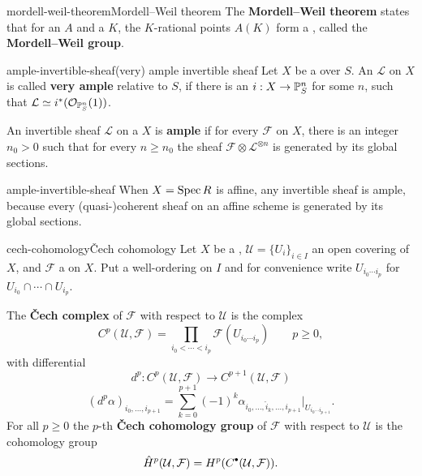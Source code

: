 \begin{topic}{mordell-weil-theorem}{Mordell--Weil theorem}
    The \textbf{Mordell--Weil theorem} states that for an  $A$ and a  $K$, the $K$-rational points $A(K)$ form a   , called the \textbf{Mordell--Weil group}.
\end{topic}

\begin{topic}{ample-invertible-sheaf}{(very) ample invertible sheaf}
    Let $X$ be a  over $S$. An  $\mathcal{L}$ on $X$ is called \textbf{very ample} relative to $S$, if there is an  $i : X \to \mathbb{P}_S^n$ for some $n$, such that $\mathcal{L} \simeq i^*(\mathcal{O}_{\mathbb{P}_S^n}(1))$.
    
    An invertible sheaf $\mathcal{L}$ on a  $X$ is \textbf{ample} if for every  $\mathcal{F}$ on $X$, there is an integer $n_0 > 0$ such that for every $n \ge n_0$ the sheaf $\mathcal{F} \otimes \mathcal{L}^{\otimes n}$ is generated by its global sections.
\end{topic}

\begin{example}{ample-invertible-sheaf}
    When $X = \operatorname{Spec} R$ is affine, any invertible sheaf is ample, because every (quasi-)coherent sheaf on an affine scheme is generated by its global sections.
\end{example}

\begin{topic}{cech-cohomology}{Čech cohomology}
    Let $X$ be a , $\mathcal{U} = \{ U_i \}_{i \in I}$ an open covering of $X$, and $\mathcal{F}$ a  on $X$. Put a well-ordering on $I$ and for convenience write $U_{i_0 \cdots i_p}$ for $U_{i_0} \cap \cdots \cap U_{i_p}$.
    
    The \textbf{Čech complex} of $\mathcal{F}$ with respect to $\mathcal{U}$ is the complex
    \[ C^p(\mathcal{U}, \mathcal{F}) = \prod_{i_0 < \cdots < i_p} \mathcal{F}(U_{i_0 \cdots i_p}) \qquad p \ge 0 , \]
    with differential
    \[ d^p : C^p(\mathcal{U}, \mathcal{F}) \to C^{p + 1}(\mathcal{U}, \mathcal{F}) \]
    \[ (d^p \alpha)_{i_0 , \ldots , i_{p + 1}} = \sum_{k = 0}^{p + 1} (-1)^k \alpha_{i_0 , \ldots , \hat{i}_k, \ldots, i_{p + 1}} | _{U_{i_0 \cdots i_{p + 1}}} . \]
    For all $p \ge 0$ the $p$-th \textbf{Čech cohomology group} of $\mathcal{F}$ with respect to $\mathcal{U}$ is the cohomology group
    \[ \hat{H}^p(\mathcal{U}, \mathcal{F}) = H^p(C^\bdot(\mathcal{U}, \mathcal{F})) . \]
\end{topic}

